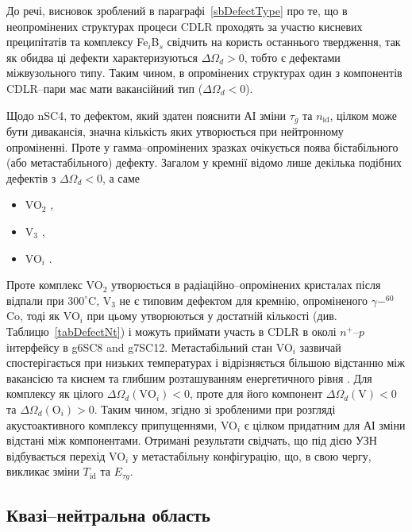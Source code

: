 До речі, висновок зроблений в параграфі~\ref{sbDefectType} про те, що
в неопромінених структурах процеси CDLR проходять за участю кисневих преципітатів та комплексу Fe$_i$B$_s$ свідчить на користь
останнього твердження, так як обидва ці дефекти характеризуються $\Delta\Omega_d>0$, тобто є дефектами міжвузольного типу.
Таким чином, в опромінених структурах один з компонентів CDLR--пари
має мати вакансійний тип ($\Delta\Omega_d<0$).

Щодо nSC4, то дефектом, який здатен пояснити АІ зміни $\tau_g$ та $n_\mathrm{id}$, цілком може бути дивакансія,
значна кількість яких утворюється при нейтронному опроміненні.
Проте у гамма--опромінених зразках очікується поява бістабільного (або метастабільного) дефекту.
Загалом у кремнії відомо лише декілька подібних дефектів з $\Delta\Omega_d<0$, а саме
\begin{itemize}
  \item VO$_2$ \cite{FTP:Murin},
  \item V$_3$ \cite{V3:Markevich},
  \item VO$_i$ \cite{MetaUFN}.
\end{itemize}
Проте комплекс VO$_2$ утворюється в радіаційно--опромінених кристалах після відпали при $300^\circ$C,
V$_3$ не є типовим дефектом для кремнію, опроміненого $\gamma-^{60}$Co,
тоді як VO$_i$ при цьому утворюються у достатній кількості (див. Таблицю~\ref{tabDefectNt}) і можуть приймати
участь в CDLR в околі $n^+$--$p$ інтерфейсу в g6SC8 and g7SC12.
Метастабільний стан VO$_i$ зазвичай спостерігається при низьких температурах
і відрізняється більшою відстанню між вакансією та киснем та глибшим розташуванням енергетичного рівня \cite{MetaUFN}.
Для комплексу як цілого $\Delta\Omega_d(\mbox{VO}_i)<0$,
проте для його компонент $\Delta\Omega_d(\mbox{V})<0$ та $\Delta\Omega_d(\mbox{O}_i)>0$.
Таким чином, згідно зі зробленими при розгляді акустоактивного комплексу припущеннями,
VO$_i$ є цілком придатним для АІ зміни відстані між компонентами.
Отримані результати свідчать, що під дією УЗН  відбувається
перехід VO$_i$ у метастабільну конфігурацію, що, в свою чергу,
викликає зміни $T_{\mathrm{id}}$ та $E_{\tau g}$.





\subsection{Квазі--нейтральна область\label{sbRadDef}}

